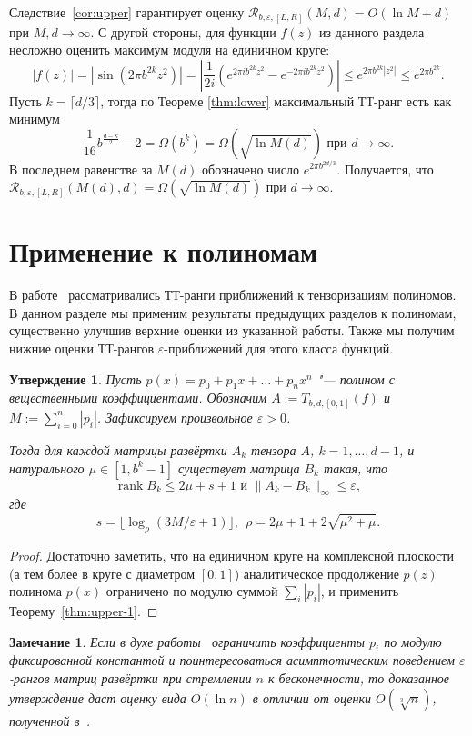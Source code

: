 \documentclass[3p]{cmmp}%
\DeclareMathOperator{\rank}{rank}
\newtheorem{proposition}{Утверждение}
\newtheorem*{note*}{Замечание}
\numberwithin{equation}{section}
\begin{document}
Следствие~\ref{cor:upper} гарантирует оценку $\mathcal{R}_{b,\varepsilon, [L,R]}(M, d) = O(\ln M + d)$ при $M,d \to \infty$.
С другой стороны, для функции $f(z)$ из данного раздела несложно оценить максимум модуля на единичном круге:
\begin{equation}\label{eq:max-of-f}
|f(z)| = \left|\sin(2\pi b^{2k}z^2)\right| = \left| \frac{1}{2i}\left(e^{2\pi i b^{2k}z^2} - e^{-2\pi i b^{2k}z^2}\right)\right| \leq e^{2\pi b^{2k}\left|z^2\right|} \leq e^{2\pi b^{2k}}.
\end{equation}
Пусть $k = \lceil d/3 \rceil$, тогда по Теореме \ref{thm:lower} максимальный ТТ-ранг есть как минимум
\[
\frac{1}{16}b^{\frac{d-k}{2}} - 2 = \Omega\left(b^k\right) = \Omega\left(\sqrt{\ln M(d)}\right) \text{ при } d \to \infty.
\]
В последнем равенстве за $M(d)$ обозначено число $e^{2\pi b^{2d/3}}$.
Получается, что $\mathcal{R}_{b,\varepsilon, [L,R]}(M(d), d) = \Omega(\sqrt{\ln M(d)})$ при $d \to \infty$.

\section{Применение к полиномам}
В работе~\cite{Vysotsky2020} рассматривались ТТ-ранги приближений к тензоризациям полиномов.
В данном разделе мы применим результаты предыдущих разделов к полиномам, существенно улучшив верхние оценки из указанной работы.
Также мы получим нижние оценки ТТ-рангов $\varepsilon$-приближений для этого класса функций.

\begin{proposition}
	Пусть $p(x) = p_0 + p_1 x + \dots + p_n x^n$ "--- полином с вещественными коэффициентами.
	Обозначим $A := T_{b,d,[0,1]}(f)$ и $M := \sum_{i=0}^n|p_i|$.
	Зафиксируем произвольное $\varepsilon > 0$.
	
	Тогда для каждой матрицы развёртки $A_k$ тензора $A$, $k = 1, \dots, d-1$, и натурального $\mu \in [1, b^k - 1]$ существует матрица $B_k$ такая, что
	\[
	\rank B_k \leq 2\mu + s + 1 \text{ и } \| A_k - B_k \|_{\infty} \leq \varepsilon,
	\]
	где 
	\[
	s = \lfloor \log_{\rho} (3M /\varepsilon +1)\rfloor,~~\rho = 2\mu + 1+2 \sqrt{{\mu}^2+\mu}.
	\]
\end{proposition}
\begin{proof}
	Достаточно заметить, что на единичном круге на комплексной плоскости (а тем более в круге с диаметром $[0,1]$) аналитическое продолжение $p(z)$ полинома $p(x)$ ограничено по модулю суммой $\sum_i |p_i|$, и применить Теорему~\ref{thm:upper-1}.
\end{proof}
\begin{note*}
	Если в духе работы~\cite{Vysotsky2020} ограничить коэффициенты $p_i$ по модулю фиксированной константой и поинтересоваться асимптотическим поведением $\varepsilon$-рангов матриц развёртки при стремлении $n$ к бесконечности, то доказанное утверждение даст оценку вида $O(\ln n)$ в отличии от оценки $O(\sqrt[3]{n})$, полученной в~\cite{Vysotsky2020}.
\end{note*}
\end{document}
